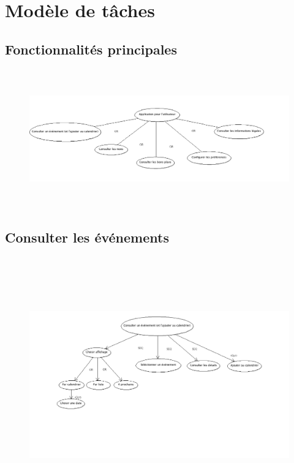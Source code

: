 \documentclass[a4paper, 11px]{article}
\begin{document}
\newpage

\section{Modèle de tâches}
\vfill
\subsection{Fonctionnalités principales}
\begin{figure}[h!]
\includegraphics[width=18cm,height=6cm]{taches_generales.png}
\end{figure}

\subsection{Consulter les événements}
\begin{figure}[h!]
\includegraphics[width=20cm,height=11cm]{consulter_evenements.png}
\end{figure}
\vfill
\clearpage
\end{document}
